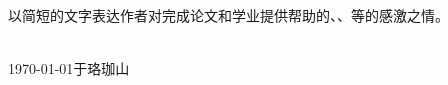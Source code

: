
\acknowledgements


以简短的文字表达作者对完成论文和学业提供帮助的、、等的感激之情。


\begin{signature}
   \\
  \today 于珞珈山
\end{signature}